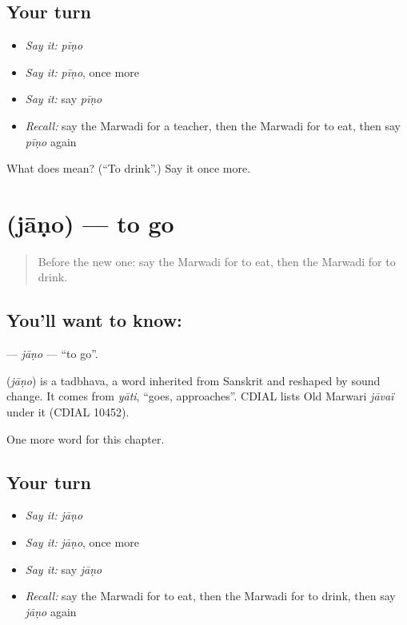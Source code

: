 \subsection*{Your turn}
\begin{itemize}
\raggedright
  \item \emph{Say it:} \emph{pīṇo}
  \item \emph{Say it:} \emph{pīṇo}, once more
  \item \emph{Say it:} say \emph{pīṇo}
  \item \emph{Recall:} say the Marwadi for a teacher, then the Marwadi for to eat, then say \emph{pīṇo} again
\end{itemize}

\begin{tcolorbox}[breakable,colback=teal!4,colframe=teal!35!black,title={Before you move on}]
What does  mean? (\textquotedblleft{}To drink\textquotedblright{}.) Say it once more.
\end{tcolorbox}
\section[\texorpdfstring{\mw{जाणो} (jāṇo)}{जाणो (jāṇo)}]{ (jāṇo) — to go}

\label{lesson:MW-C51-jano}



\begin{quote}
Before the new one: say the Marwadi for to eat, then the Marwadi for to drink.
\end{quote}

\subsection*{You'll want to know: }
\textbf{} — \emph{jāṇo} — \textquotedblleft{}to go\textquotedblright{}.

\begin{cousinweb}
\textbf{} (\emph{jāṇo}) is a tadbhava, a word inherited from Sanskrit and reshaped by sound change. It comes from \emph{yāti}, \textquotedblleft{}goes, approaches\textquotedblright{}. CDIAL lists Old Marwari \emph{jāvaï} under it (CDIAL 10452).
\end{cousinweb}

\begin{grammarlens}[title={What you've built}]
One more word for this chapter.
\end{grammarlens}

\subsection*{Your turn}
\begin{itemize}
\raggedright
  \item \emph{Say it:} \emph{jāṇo}
  \item \emph{Say it:} \emph{jāṇo}, once more
  \item \emph{Say it:} say \emph{jāṇo}
  \item \emph{Recall:} say the Marwadi for to eat, then the Marwadi for to drink, then say \emph{jāṇo} again
\end{itemize}

